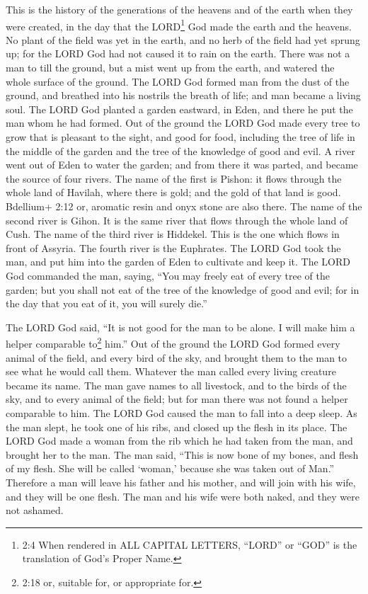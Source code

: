  This is the history of the generations of the heavens and
of the earth when they were created, in the day that the LORD\footnote{2:4
  When rendered in ALL CAPITAL LETTERS, ``LORD'' or ``GOD'' is the
  translation of God's Proper Name.} God made the earth and the heavens.
 No plant of the field was yet in the earth, and no herb of
the field had yet sprung up; for the LORD God had not caused it to rain
on the earth. There was not a man to till the ground,  but a
mist went up from the earth, and watered the whole surface of the
ground.  The LORD God formed man from the dust of the
ground, and breathed into his nostrils the breath of life; and man
became a living soul.  The LORD God planted a garden
eastward, in Eden, and there he put the man whom he had formed.
 Out of the ground the LORD God made every tree to grow that
is pleasant to the sight, and good for food, including the tree of life
in the middle of the garden and the tree of the knowledge of good and
evil.  A river went out of Eden to water the garden; and
from there it was parted, and became the source of four rivers.
 The name of the first is Pishon: it flows through the
whole land of Havilah, where there is gold;  and the gold
of that land is good. Bdellium+ 2:12 or, aromatic resin and onyx stone
are also there.  The name of the second river is Gihon. It
is the same river that flows through the whole land of Cush.
 The name of the third river is Hiddekel. This is the one
which flows in front of Assyria. The fourth river is the Euphrates.
 The LORD God took the man, and put him into the garden of
Eden to cultivate and keep it.  The LORD God commanded the
man, saying, ``You may freely eat of every tree of the garden;
 but you shall not eat of the tree of the knowledge of good
and evil; for in the day that you eat of it, you will surely die.''

 The LORD God said, ``It is not good for the man to be
alone. I will make him a helper comparable to\footnote{2:18 or, suitable
  for, or appropriate for.} him.''  Out of the ground the
LORD God formed every animal of the field, and every bird of the sky,
and brought them to the man to see what he would call them. Whatever the
man called every living creature became its name.  The man
gave names to all livestock, and to the birds of the sky, and to every
animal of the field; but for man there was not found a helper comparable
to him.  The LORD God caused the man to fall into a deep
sleep. As the man slept, he took one of his ribs, and closed up the
flesh in its place.  The LORD God made a woman from the rib
which he had taken from the man, and brought her to the man.
 The man said, ``This is now bone of my bones, and flesh of
my flesh. She will be called `woman,' because she was taken out of
Man.''  Therefore a man will leave his father and his
mother, and will join with his wife, and they will be one flesh.
 The man and his wife were both naked, and they were not
ashamed.


